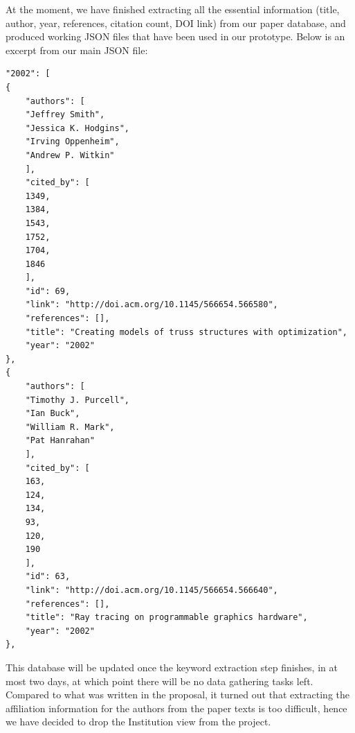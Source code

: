 \documentclass[12pt]{article}
\begin{document}
At the moment, we have finished extracting all the essential information (title, author, year, references, citation count, DOI link) from our paper database, and produced working JSON files that have been used in our prototype. Below is an excerpt from our main JSON file:

\begin{lstlisting}
"2002": [
{
    "authors": [
    "Jeffrey Smith", 
    "Jessica K. Hodgins", 
    "Irving Oppenheim", 
    "Andrew P. Witkin"
    ], 
    "cited_by": [
    1349, 
    1384, 
    1543, 
    1752, 
    1704, 
    1846
    ], 
    "id": 69, 
    "link": "http://doi.acm.org/10.1145/566654.566580", 
    "references": [], 
    "title": "Creating models of truss structures with optimization", 
    "year": "2002"
}, 
{
    "authors": [
    "Timothy J. Purcell", 
    "Ian Buck", 
    "William R. Mark", 
    "Pat Hanrahan"
    ], 
    "cited_by": [
    163, 
    124, 
    134, 
    93, 
    120, 
    190
    ], 
    "id": 63, 
    "link": "http://doi.acm.org/10.1145/566654.566640", 
    "references": [], 
    "title": "Ray tracing on programmable graphics hardware", 
    "year": "2002"
}, 
\end{lstlisting}

This database will be updated once the keyword extraction step finishes, in at most two days, at which point there will be no data gathering tasks left. Compared to what was written in the proposal, it turned out that extracting the affiliation information for the authors from the paper texts is too difficult, hence we have decided to drop the Institution view from the project.
\end{document}
